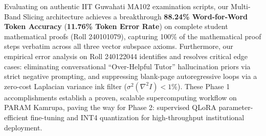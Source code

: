 \documentclass[12pt,a4paper]{report}
\theoremstyle{plain}
\theoremstyle{definition}
\theoremstyle{remark}
\begin{document}
Evaluating on authentic IIT Guwahati MA102 examination scripts, our Multi-Band Slicing architecture achieves a breakthrough \textbf{88.24\% Word-for-Word Token Accuracy} (\textbf{11.76\% Token Error Rate}) on complete student mathematical proofs (Roll 240101079), capturing 100\% of the mathematical proof steps verbatim across all three vector subspace axioms. Furthermore, our empirical error analysis on Roll 240122044 identifies and resolves critical edge cases: eliminating conversational ``Over-Helpful Tutor'' hallucination priors via strict negative prompting, and suppressing blank-page autoregressive loops via a zero-cost Laplacian variance ink filter ($\sigma^2(\nabla^2 I) < 1\%$). These Phase 1 accomplishments establish a proven, scalable supercomputing workflow on PARAM Kamrupa, paving the way for Phase 2: supervised QLoRA parameter-efficient fine-tuning and INT4 quantization for high-throughput institutional deployment.

\clearpage

\setcounter{tocdepth}{1}
\setcounter{secnumdepth}{2}
\tableofcontents
\clearpage
\begingroup
\let\clearpage\relax
\listoffigures
\vspace{1.5cm}
\listoftables
\endgroup

\newpage
{}
\setcounter{page}{1}










\end{document}
